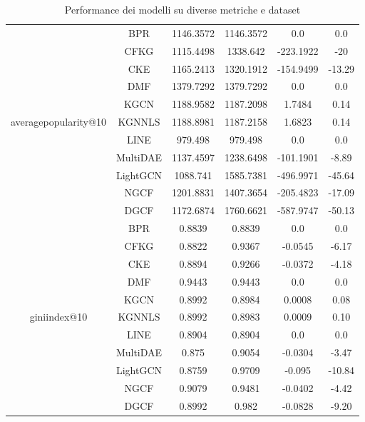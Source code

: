 \begin{table}[H]
{\begin{tabular}{|c|c|c|c|c|c|}
            \multirow{11}{*}{averagepopularity@10} 
                & BPR & 1146.3572 & 1146.3572 & 0.0 & 0.0 \\ \cline{2-6} 
                & CFKG & 1115.4498 & 1338.642 & -223.1922 & -20 \\ \cline{2-6} 
                & CKE & 1165.2413 & 1320.1912 & -154.9499 & -13.29 \\ \cline{2-6} 
                & DMF & 1379.7292 & 1379.7292 & 0.0 & 0.0 \\ \cline{2-6} 
                & KGCN & 1188.9582 & 1187.2098 & 1.7484 & 0.14 \\ \cline{2-6} 
                & KGNNLS & 1188.8981 & 1187.2158 & 1.6823 & 0.14 \\ \cline{2-6} 
                & LINE & 979.498 & 979.498 & 0.0 & 0.0 \\ \cline{2-6} 
                & MultiDAE & 1137.4597 & 1238.6498 & -101.1901 & -8.89 \\ \cline{2-6} 
                & LightGCN & 1088.741 & 1585.7381 & -496.9971 & -45.64 \\ \cline{2-6} 
                & NGCF & 1201.8831 & 1407.3654 & -205.4823 & -17.09 \\ \cline{2-6} 
                & DGCF & 1172.6874 & 1760.6621 & -587.9747 & -50.13 \\ \hline

            \multirow{11}{*}{giniindex@10} 
                & BPR & 0.8839 & 0.8839 & 0.0 & 0.0 \\ \cline{2-6} 
                & CFKG & 0.8822 & 0.9367 & -0.0545 & -6.17 \\ \cline{2-6} 
                & CKE & 0.8894 & 0.9266 & -0.0372 & -4.18 \\ \cline{2-6} 
                & DMF & 0.9443 & 0.9443 & 0.0 & 0.0 \\ \cline{2-6} 
                & KGCN & 0.8992 & 0.8984 & 0.0008 & 0.08 \\ \cline{2-6} 
                & KGNNLS & 0.8992 & 0.8983 & 0.0009 & 0.10 \\ \cline{2-6} 
                & LINE & 0.8904 & 0.8904 & 0.0 & 0.0 \\ \cline{2-6} 
                & MultiDAE & 0.875 & 0.9054 & -0.0304 & -3.47 \\ \cline{2-6} 
                & LightGCN & 0.8759 & 0.9709 & -0.095 & -10.84 \\ \cline{2-6} 
                & NGCF & 0.9079 & 0.9481 & -0.0402 & -4.42 \\ \cline{2-6} 
                & DGCF & 0.8992 & 0.982 & -0.0828 & -9.20 \\ \hline
        \end{tabular}
    }
    \caption{Performance dei modelli su diverse metriche e dataset}
\end{table}



